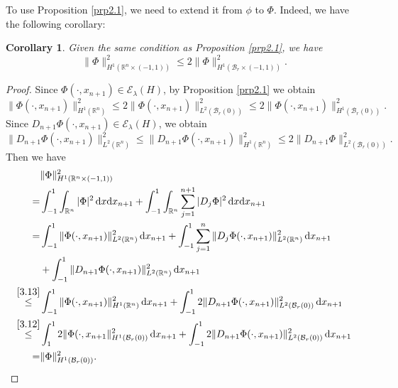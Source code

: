 \documentclass{article}
\numberwithin{equation}{section}
\renewcommand{\d}{\,\mathrm{d}}
\newcommand\R{\ensuremath{\mathbb{R}}}
\newtheorem{corollary}[theorem]{Corollary}
\numberwithin{equation}{section}
\theoremstyle{definition}
\begin{document}
To use Proposition \ref{prp2.1}, we need to extend it from $\phi$ to $\Phi$. Indeed, we have the following corollary:
\begin{corollary}\label{crc3.4}
	Given the same condition as Proposition \ref{prp2.1}, we have
	\begin{equation}\label{3.11}
		\|\Phi\|^2_{H^{1}\left( \R^{n}\times (-1,1) \right) }\le 2\|\Phi\|^2_{H^{1}(\mathcal{B}_r \times (-1,1))}.
	\end{equation}
\end{corollary}
\begin{proof}
	Since $\Phi(\cdot ,x_{n+1})\in \mathcal{E}_{\lambda}(H)$, by Proposition \ref{prp2.1} we obtain
	\begin{equation}\label{3.12}
		\|\Phi(\cdot ,x_{n+1})\|^2_{H^{1}(\R^{n})}\le 2\|\Phi(\cdot ,x_{n+1})\|^2_{L^2\left( \mathcal{B}_r(0) \right) }\le 2 \|\Phi(\cdot ,x_{n+1})\|^2_{H^1\left( \mathcal{B}_r(0) \right) }.
	\end{equation}
	Since $D_{n+1}\Phi(\cdot ,x_{n+1})\in \mathcal{E}_{\lambda}(H)$, we obtain
	\begin{equation}\label{3.13}
		\|D_{n+1}\Phi(\cdot ,x_{n+1})\|^2_{L^2(\R^{n})}\le \|D_{n+1}\Phi(\cdot ,x_{n+1})\|^2_{H^{1}(\R^{n})}\le 2 \|D_{n+1}\Phi\|^2_{L^2\left( \mathcal{B}_r(0) \right) }.
	\end{equation}
Then we have
\begin{equation}
	\begin{aligned}
		&\|\Phi\|^2_{H^{1}(\R^{n}\times (-1,1))}\\
		=& \int_{-1}^{1}\int_{\R^{n}}|\Phi|^2 \d x\mathrm{d}x_{n+1}+ \int_{-1}^{1} \int_{\R^{n}}\sum_{j=1}^{n+1} |D_j\Phi|^2\d x\mathrm{d}x_{n+1}\\
		=& \int_{-1}^{1}\|\Phi(\cdot ,x_{n+1})\|^2_{L^2(\R^{n})}\d x_{n+1}+ \int_{-1}^{1}\sum_{j=1}^{n} \|D_j \Phi(\cdot ,x_{n+1})\|^2_{L^2(\R^{n})}\d x_{n+1}\\
		 &+ \int_{-1}^{1}\|D_{n+1}\Phi(\cdot ,x_{n+1})\|^2_{L^2(\R^{n})}\d x_{n+1}\\
		\overset{\eqref{3.13}}{\le}& \int_{-1}^{1}\|\Phi(\cdot ,x_{n+1})\|^2_{H^{1}(\R^{n})}\d x_{n+1} + \int_{-1}^{1}2\|D_{n+1}\Phi(\cdot ,x_{n+1})\|^2_{L^2(\mathcal{B}_r(0))}\d x_{n+1}\\
		\overset{\eqref{3.12}}{\le} & \int_{1}^{1}2 \|\Phi(\cdot ,x_{n+1}\|^2_{H^{1}(\mathcal{B}_r(0))}\d x_{n+1}+\int_{-1}^{1}2\|D_{n+1}\Phi(\cdot ,x_{n+1})\|^2_{L^2(\mathcal{B}_r(0))}\d x_{n+1}\\
		=& \|\Phi\|^2_{H^{1}\left( \mathcal{B}_r(0) \right) }.
	\end{aligned} 
\end{equation}
\end{proof}
\end{document}
